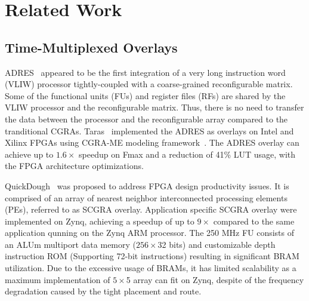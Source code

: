 \section{Related Work}


\subsection{Time-Multiplexed Overlays}

ADRES~\cite{mei2003adres} appeared to be the first integration of a very long instruction word (VLIW) processor tightly-coupled with a coarse-grained reconfigurable matrix. 
Some of the functional units (FUs) and register files (RFs) are shared by the VLIW processor and the reconfigurable matrix. 
Thus, there is no need to transfer the data between the processor and the reconfigurable array compared to the tranditional CGRAs. 
Taras~\cite{taras2019impact} implemented the ADRES as overlays on Intel and Xilinx FPGAs using CGRA-ME modeling framework~\cite{chin2017cgra}. 
The ADRES overlay can achieve up to $1.6\times$ speedup on Fmax and a reduction of 41\% LUT usage, with the FPGA architecture optimizations. 


QuickDough~\cite{liu2015quickdough} was proposed to address FPGA design productivity issues. 
It is comprised of an array of nearest neighbor interconnected processing elements (PEs), referred to as SCGRA overlay.  
Application specific SCGRA overlay were implemented on Zynq, achieving a speedup of up to $9\times$ compared to the same application qunning on the Zynq ARM processor. 
The 250 MHz FU consists of an ALUm multiport data memory ($256\times$32 bits) and customizable depth instruction ROM (Supporting 72-bit instructions) resulting in significant BRAM utilization. 
Due to the excessive usage of BRAMs, it has limited scalability as a maximum implementation of $5\times$5 array can fit on Zynq, despite of the frequency degradation caused by the tight placement and route. 


